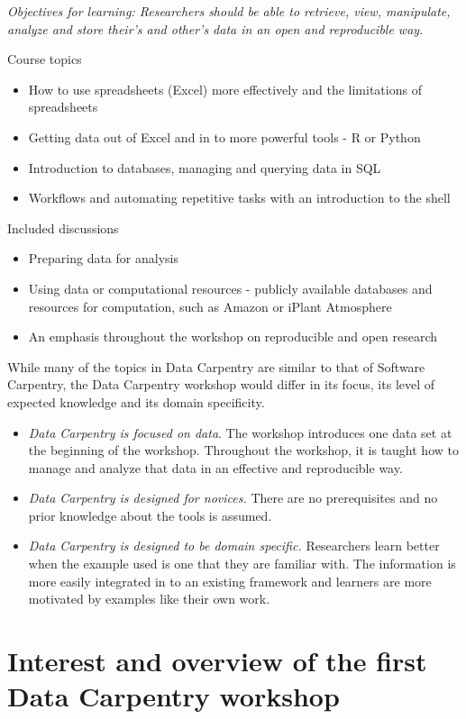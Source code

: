 \documentclass[11pt]{article}
\begin{document}
\emph{Objectives for learning:
Researchers should be able to retrieve, view, manipulate, analyze and store their's and other's data in an open and reproducible way.}

Course topics
\begin{itemize}
\item How to use spreadsheets (Excel) more effectively and the limitations of spreadsheets
\item Getting data out of Excel and in to more powerful tools - R or Python
\item Introduction to databases, managing and querying data in SQL
\item Workflows and automating repetitive tasks with an introduction to the shell
\end{itemize}

Included discussions
\begin{itemize}
\item Preparing data for analysis
\item Using data or computational resources - publicly available databases and resources for computation, such as Amazon or  iPlant Atmosphere
\item An emphasis throughout the workshop on reproducible and open research 
\end{itemize}

While many of the topics in Data Carpentry are similar to that of Software Carpentry, the Data Carpentry 
workshop would differ in its focus, its level of expected knowledge and its domain specificity.
\begin{itemize}
\item \emph{Data Carpentry is focused on data}. The workshop introduces one data set at the beginning of the
workshop. Throughout the workshop, it is taught how to manage and analyze that data in an effective and reproducible 
way.
\item \emph{Data Carpentry is designed for novices.} There are no prerequisites and no 
prior knowledge about the tools is assumed.
\item \emph{Data Carpentry is designed to be domain specific.} Researchers learn better when the example used is
one that they are familiar with. The information is more easily integrated in to an existing framework and learners 
are more motivated by examples like their own work.
\end{itemize}


\section{Interest and overview of the first Data Carpentry workshop}
\end{document}
